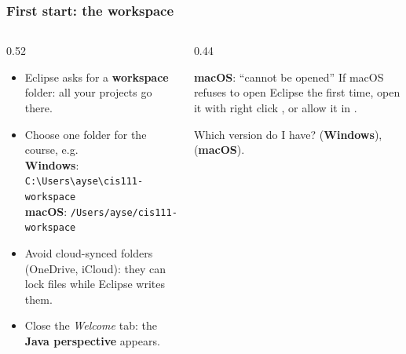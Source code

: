 \documentclass[aspectratio=169,10pt,compress]{beamer}
\newcommand{\win}{\textbf{Windows}}
\newcommand{\mac}{\textbf{macOS}}
\begin{document}
\begin{frame}[t,fragile] \frametitle{First start: the workspace}
  \begin{columns}[T]
    \begin{column}{0.52\textwidth}
      \begin{itemize}\small
        \item Eclipse asks for a \textbf{workspace} folder: all your projects go there.
        \item Choose one folder for the course, e.g.\\
              \win: \texttt{C:\textbackslash Users\textbackslash ayse\textbackslash cis111-workspace}\\
              \mac: \texttt{/Users/ayse/cis111-workspace}
        \item Avoid cloud-synced folders (OneDrive, iCloud): they can lock files while Eclipse writes them.
        \item Close the \emph{Welcome} tab: the \textbf{Java perspective} appears.
      \end{itemize}
    \end{column}
    \begin{column}{0.44\textwidth}
      \begin{block}{\mac: ``cannot be opened''}
        \small If macOS refuses to open Eclipse the first time, open it with right click ,
        or allow it in .
      \end{block}
      \begin{block}{Which version do I have?}
        \small {} (\win),  (\mac).
      \end{block}
    \end{column}
  \end{columns}
\end{frame}

\end{document}
